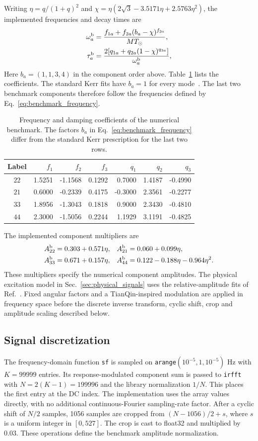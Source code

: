 \documentclass[10pt,prd,aps,a4paper,twocolumn,superscriptaddress,nofootinbib,floatfix]{revtex4-2}
\begin{document}
Writing $\eta=q/(1+q)^2$ and $\chi=\eta(2\sqrt{3}-3.5171\eta+2.5763\eta^2)$, the implemented frequencies and decay times are
\begin{align}
\omega_a^{\rm b}&=\frac{f_{1a}+f_{2a}(b_a-\chi)^{f_{3a}}}{M T_\odot},\label{eq:benchmark_frequency}\\
\tau_a^{\rm b}&=\frac{2[q_{1a}+q_{2a}(1-\chi)^{q_{3a}}]}{\omega_a^{\rm b}},
\end{align}
Here $b_a=(1,1,3,4)$ in the component order above. Table~\ref{tab:frequency_coefficients} lists the coefficients. The standard Kerr fits have $b_a=1$ for every mode~\cite{berti2006gravitational}. The last two benchmark components therefore follow the frequencies defined by Eq.~\eqref{eq:benchmark_frequency}.
\begin{table}[t]
\caption{Frequency and damping coefficients of the numerical benchmark. The factors $b_a$ in Eq.~\eqref{eq:benchmark_frequency} differ from the standard Kerr prescription for the last two rows.}\label{tab:frequency_coefficients}
\centering\begin{tabular}{crrrrrr}\hline\hline
Label & $f_1$ & $f_2$ & $f_3$ & $q_1$ & $q_2$ & $q_3$\\\hline
$22$ &1.5251&-1.1568&0.1292&0.7000&1.4187&-0.4990\\
$21$ &0.6000&-0.2339&0.4175&-0.3000&2.3561&-0.2277\\
$33$ &1.8956&-1.3043&0.1818&0.9000&2.3430&-0.4810\\
$44$ &2.3000&-1.5056&0.2244&1.1929&3.1191&-0.4825\\\hline\hline
\end{tabular}\end{table}
The implemented component multipliers are
\begin{align}
A_{22}^{\rm b}&=0.303+0.571\eta,& A_{21}^{\rm b}&=0.060+0.099\eta,\nonumber\\
A_{33}^{\rm b}&=0.671+0.157\eta,& A_{44}^{\rm b}&=0.122-0.188\eta-0.964\eta^2.
\end{align}
These multipliers specify the numerical component amplitudes. The physical excitation model in Sec.~\ref{sec:physical_signals} uses the relative-amplitude fits of Ref.~\cite{Kamaretsos2012}. Fixed angular factors and a TianQin-inspired modulation are applied in frequency space before the discrete inverse transform, cyclic shift, crop and amplitude scaling described below.

\subsection{Signal discretization}
The frequency-domain function \texttt{sf} is sampled on \texttt{arange}$(10^{-5},1,10^{-5})$ Hz with $K=99999$ entries. Its response-modulated component sum is passed to \texttt{irfft} with $N=2(K-1)=199996$ and the library normalization $1/N$. This places the first entry at the DC index. The implementation uses the array values directly, with no additional continuous-Fourier sampling-rate factor. After a cyclic shift of $N/2$ samples, 1056 samples are cropped from $(N-1056)/2+s$, where $s$ is a uniform integer in $[0,527]$. The crop is cast to float32 and multiplied by 0.03. These operations define the benchmark amplitude normalization.
\end{document}
